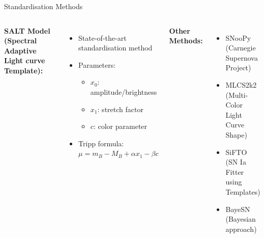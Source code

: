\documentclass[aspectratio=169]{beamer}
\begin{document}
\begin{frame}{Standardisation Methods}
  \begin{columns}
    \textbf{SALT Model (Spectral Adaptive Light curve Template):}
    \begin{itemize}
      \item State-of-the-art standardisation method
      \item Parameters:
        \begin{itemize}
          \item $x_0$: amplitude/brightness
          \item $x_1$: stretch factor
          \item $c$: color parameter
        \end{itemize}
      \item Tripp formula: $\mu = m_B - M_B + \alpha x_1 - \beta c$
    \end{itemize}
    
    \textbf{Other Methods:}
    \begin{itemize}
      \item SNooPy (Carnegie Supernova Project)
      \item MLCS2k2 (Multi-Color Light Curve Shape)
      \item SiFTO (SN Ia Fitter using Templates)
      \item BayeSN (Bayesian approach)
    \end{itemize}
    \vspace{0.5cm}
    \centering
  \end{columns}
\end{frame}
\end{document}
